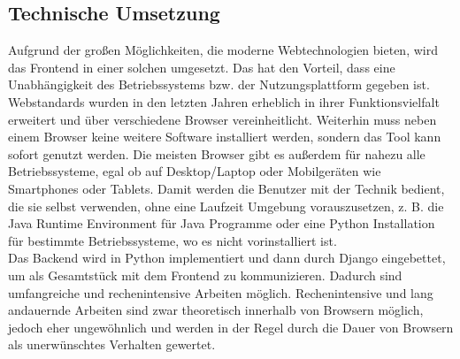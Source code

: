 \subsection{Technische Umsetzung}
Aufgrund der großen Möglichkeiten, die moderne Webtechnologien bieten, wird das
Frontend in einer solchen umgesetzt. Das hat den Vorteil, dass eine
Unabhängigkeit des Betriebssystems bzw. der Nutzungsplattform gegeben ist. Webstandards wurden in
den letzten Jahren erheblich in ihrer Funktionsvielfalt erweitert und über
verschiedene Browser vereinheitlicht. Weiterhin muss neben einem Browser keine
weitere Software installiert werden, sondern das Tool kann sofort genutzt
werden. Die meisten Browser gibt es außerdem für nahezu alle Betriebssysteme,
egal ob auf Desktop/Laptop oder Mobilgeräten wie Smartphones oder Tablets. Damit
werden die Benutzer mit der Technik bedient, die sie selbst verwenden, ohne
eine Laufzeit Umgebung vorauszusetzen, z. B. die Java Runtime Environment für
Java Programme oder eine Python Installation für bestimmte
Betriebssysteme, wo es nicht vorinstalliert ist.\\
Das Backend wird in Python implementiert und dann durch Django eingebettet, um
als Gesamtstück mit dem Frontend zu kommunizieren. Dadurch sind umfangreiche und
rechenintensive Arbeiten möglich. Rechenintensive und lang andauernde
Arbeiten sind zwar theoretisch innerhalb von Browsern möglich, jedoch eher
ungewöhnlich und werden in der Regel durch die Dauer von Browsern als
unerwünschtes Verhalten gewertet.

\pagebreak[4]